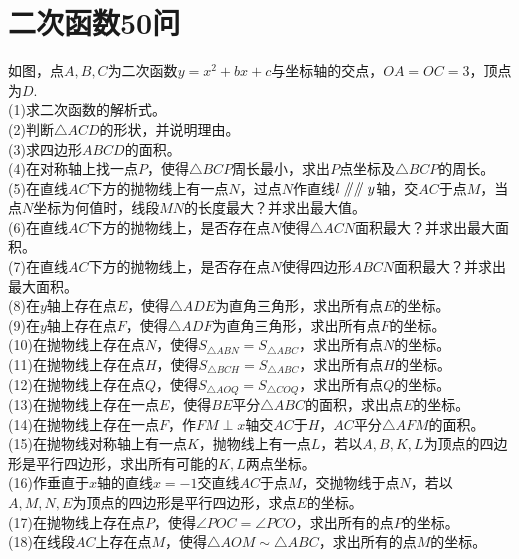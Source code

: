 \documentclass{ecnuthesis}
\newcommand\px{\mathrel{/\mkern-5mu/}}  %
\begin{document}
\section{二次函数50问}
\begin{example}
    如图，点$A,B,C$为二次函数$y=x^2+bx+c$与坐标轴的交点，$OA=OC=3$，顶点为$D$. \\
    (1)求二次函数的解析式。 \\
    (2)判断$\triangle ACD$的形状，并说明理由。 \\
    (3)求四边形$ABCD$的面积。 \\
    (4)在对称轴上找一点$P$，使得$\triangle BCP$周长最小，求出$P$点坐标及$\triangle BCP$的周长。 \\
    (5)在直线$AC$下方的抛物线上有一点$N$，过点$N$作直线$l\px\px y$轴，交$AC$于点$M$，当点$N$坐标为何值时，线段$MN$的长度最大？并求出最大值。\\
    (6)在直线$AC$下方的抛物线上，是否存在点$N$使得$\triangle ACN$面积最大？并求出最大面积。 \\
    (7)在直线$AC$下方的抛物线上，是否存在点$N$使得四边形$ABCN$面积最大？并求出最大面积。 \\
    (8)在$y$轴上存在点$E$，使得$\triangle ADE$为直角三角形，求出所有点$E$的坐标。 \\
    (9)在$y$轴上存在点$F$，使得$\triangle ADF$为直角三角形，求出所有点$F$的坐标。 \\
    (10)在抛物线上存在点$N$，使得$S_{\triangle ABN}=S_{\triangle ABC}$，求出所有点$N$的坐标。 \\
    (11)在抛物线上存在点$H$，使得$S_{\triangle BCH}=S_{\triangle ABC}$，求出所有点$H$的坐标。 \\
    (12)在抛物线上存在点$Q$，使得$S_{\triangle AOQ}=S_{\triangle COQ}$，求出所有点$Q$的坐标。 \\
    (13)在抛物线上存在一点$E$，使得$BE$平分$\triangle ABC$的面积，求出点$E$的坐标。 \\
    (14)在抛物线上存在一点$F$，作$FM\perp x$轴交$AC$于$H$，$AC$平分$\triangle AFM$的面积。 \\
    (15)在抛物线对称轴上有一点$K$，抛物线上有一点$L$，若以$A,B,K,L$为顶点的四边形是平行四边形，求出所有可能的$K,L$两点坐标。\\
    (16)作垂直于$x$轴的直线$x=-1$交直线$AC$于点$M$，交抛物线于点$N$，若以$A,M,N,E$为顶点的四边形是平行四边形，求点$E$的坐标。 \\
    (17)在抛物线上存在点$P$，使得$\angle POC=\angle PCO$，求出所有的点$P$的坐标。 \\
    (18)在线段$AC$上存在点$M$，使得$\triangle AOM \sim \triangle ABC$，求出所有的点$M$的坐标。 \\

\end{example}
\end{document}
